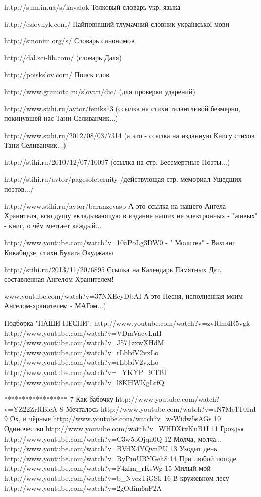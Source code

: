 http://sum.in.ua/s/kavalok
Толковый словарь укр. языка

http://eslovnyk.com/
Найповніший тлумачний словник
української мови

http://sinonim.org/s/
Словарь синонимов


http://dal.sci-lib.com/
(словарь Даля)

http://poiskslov.com/
Поиск слов

http://www.gramota.ru/slovari/dic/
(для проверки ударений)

http://www.stihi.ru/avtor/feniks13
(ссылка на стихи талантливой безмерно, покинувшей нас Тани Селиванчик...)

http://www.stihi.ru/2012/08/03/7314
(а это - ссылка на изданную Книгу стихов Тани Селиванчик...)

http://stihi.ru/2010/12/07/10097
(ссылка на стр. Бессмертные Поэты...)

http://stihi.ru/avtor/pagesofeternity
/действующая стр.-мемориал Ушедших поэтов.../

http://www.stihi.ru/avtor/baranzevasp
А это ссылка на нашего Ангела-Хранителя, всю душу вкладывающую в издание наших не электронных - "живых" - книг, о чём мечтает каждый...

http://www.youtube.com/watch?v=10aPoLg3DW0 -
" Молитва" - Вахтанг Кикабидзе, стихи Булата Окуджавы

http://stihi.ru/2013/11/20/6895
Ссылка на Календарь Памятных Дат, составленная Ангелом-Хранителем!

www.youtube.com/watch?v=37NXEcyDbAI
А это Песня, исполненная моим Ангелом-хранителем - МАГом...)

Подборка "НАШИ ПЕСНИ":
http://www.youtube.com/watch?v=zvRlm4R5vgk
http://www.youtube.com/watch?v=VDmVacvLnII
http://www.youtube.com/watch?v=J571zxwXHdM
http://www.youtube.com/watch?v=rLbbfV2vxLo
http://www.youtube.com/watch?v=rLbbfV2vxLo
http://www.youtube.com/watch?v=_YKYP_9iTBI
http://www.youtube.com/watch?v=l8KHWKgLrfQ


******************
7 Как бабочку http://www.youtube.com/watch?v=YZ22ZrRBieA
8 Мечталось http://www.youtube.com/watch?v=sN7Me1T0InI
9 Ох, и чёрные http://www.youtube.com/watch?v=w-Widw5sAGs
10 Одиночество http://www.youtube.com/watch?v=WHDXtxKuB1I
11 Гроздья http://www.youtube.com/watch?v=C3w5oOjqn0Q
12 Молча, молча... http://www.youtube.com/watch?v=BVdX4YQvnPU
13 Уходит день http://www.youtube.com/watch?v=RyPmURYGeh8
14 При любой погоде http://www.youtube.com/watch?v=F4zlm_rKsWg
15 Милый мой http://www.youtube.com/watch?v=b_NyezTiGSk
16 В кружевном лесу http://www.youtube.com/watch?v=2gOdim6aF2A

